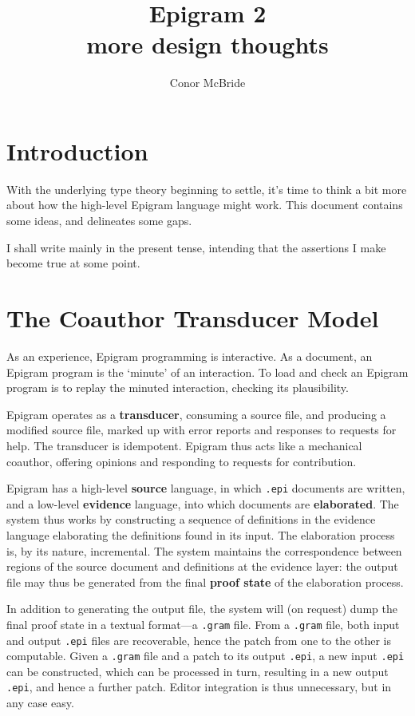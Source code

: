 \documentclass{article}
\begin{document}
\title{Epigram 2\\
       more design thoughts}
\author{Conor McBride}
\maketitle

\section{Introduction}

With the underlying type theory beginning to settle, it's time to
think a bit more about how the high-level Epigram language might
work. This document contains some ideas, and delineates some gaps.

I shall write mainly in the present tense, intending that the
assertions I make become true at some point.

\section{The Coauthor Transducer Model}

As an experience, Epigram programming is interactive. As a document,
an Epigram program is the `minute' of an interaction. To load and
check an Epigram program is to replay the minuted interaction,
checking its plausibility.

Epigram operates as a \textbf{transducer}, consuming a source
file, and producing a modified source file, marked up with error
reports and responses to requests for help. The transducer is
idempotent. Epigram thus acts like a mechanical coauthor, offering
opinions and responding to requests for contribution.

Epigram has a high-level \textbf{source} language, in which
\texttt{.epi} documents are written, and a low-level \textbf{evidence}
language, into which documents are \textbf{elaborated}. The system
thus works by constructing a sequence of definitions in the evidence
language elaborating the definitions found in its input. The
elaboration process is, by its nature, incremental. The system
maintains the correspondence between regions of the source document
and definitions at the evidence layer: the output file may thus be
generated from the final \textbf{proof state} of the elaboration
process.

In addition to generating the output file, the system will (on
request) dump the final proof state in a textual format---a
\texttt{.gram} file. From a \texttt{.gram} file, both input and output
\texttt{.epi} files are recoverable, hence the patch from one to the
other is computable. Given a \texttt{.gram} file and
a patch to its output \texttt{.epi}, a new input \texttt{.epi} can be
constructed, which can be processed in turn, resulting in a new output
\texttt{.epi}, and hence a further patch. Editor integration is thus
unnecessary, but in any case easy.
\end{document}
